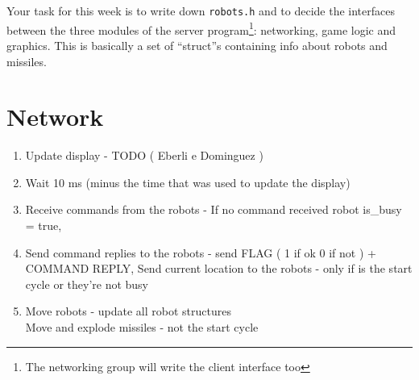 \documentclass{article}
\begin{document}
       Your task for this week is to write down \texttt{robots.h} and
       to decide the interfaces between the three modules of the server
       program\footnote{The networking group will write the client
         interface too}: networking, game logic and graphics.  This is
       basically a set of ``struct''s containing info about robots and
       missiles.
       
\section{Network}

      \begin{enumerate}
        
        \item Update display - TODO ( Eberli e Dominguez )
        \item Wait 10 ms (minus the time that was used to update the display) 
        \item Receive commands from the robots - If no command received robot is_busy =  true, 
        \item Send command replies to the robots - send FLAG ( 1 if ok 0 if not  ) + COMMAND REPLY,
    	        Send current location to the robots - only if is the start cycle or they're not busy
        \item Move robots - update all robot structures \\
           	Move and explode missiles - not the start cycle
        \end{enumerate}
\end{document}
